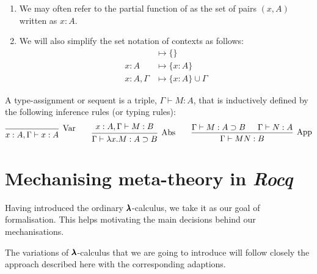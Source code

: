 \begin{notation} \hfill
  \begin{enumerate}
  \item We may often refer to the partial function of as the set of pairs $(x, A)$ written as $x:A$.
  \item We will also simplify the set notation of contexts as follows:
    \begin{align*}
      &\mapsto \{ \} \\
      x:A         &\mapsto \{ x:A \} \\
      x:A, \Gamma &\mapsto \{ x:A \} \cup \Gamma
    \end{align*}
  \end{enumerate}
\end{notation}

\begin{definition}
  A type-assignment or sequent is a triple, $\Gamma \vdash M:A$, that is inductively defined by the following inference rules (or typing rules):
  \[
    \begin{prooftree}
      \infer0[Var]{ x:A, \Gamma \vdash x:A } 
    \end{prooftree}
    \qquad
    \begin{prooftree}
      \hypo{ x:A, \Gamma \vdash M:B }
      \infer1[Abs]{ \Gamma \vdash \lambda x . M : A \supset B  } 
    \end{prooftree}
    \qquad
    \begin{prooftree}
      \hypo{ \Gamma \vdash M : A \supset B }
      \hypo{ \Gamma \vdash N : A }	
      \infer2[App]{ \Gamma \vdash M N : B } 
    \end{prooftree}
  \]
\end{definition}


\section{Mechanising meta-theory in \textit{Rocq}}

Having introduced the ordinary $\pmb{\lambda}$-calculus, we take it as our goal of formalisation.
This helps motivating the main decisions behind our mechanisations.

The variations of $\pmb{\lambda}$-calculus that we are going to introduce will follow closely the approach described here with the corresponding adaptions.


